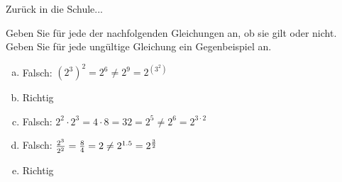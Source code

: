 \begin{frame}{Zurück in die Schule...}
    \begin{exercise}
        Geben Sie für jede der nachfolgenden Gleichungen an, ob sie gilt oder nicht. Geben Sie für jede ungültige Gleichung ein Gegenbeispiel an.
    \end{exercise}
    \pause
    \begin{solve}
    \begin{enumerate}[a)]
        \item Falsch: $(2^3)^2=2^6\neq2^9=2^{(3^2)}$%
        \pause
        \item Richtig%
        \pause
        \item Falsch: $2^2\cdot2^3=4\cdot8=32=2^5\neq2^6=2^{3\cdot2}$%
        \pause
        \item Falsch: $\betterfrac{2^3}{2^2}=\frac{8}{4}=2\neq2^{1.5}=2^{\frac{3}{2}}$%
        \pause
        \item Richtig%
    \end{enumerate}
    \end{solve}
\end{frame}